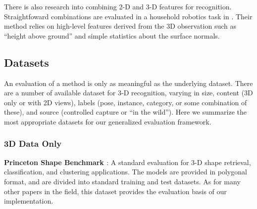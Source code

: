 There is also research into combining 2-D and 3-D features for recognition.
Straightfoward combinations are evaluated in a household robotics task in \cite{Gould2008}.
Their method relies on high-level features derived from the 3D observation such as ``height above ground'' and simple statistics about the surface normals.


\subsection{Datasets}

An evaluation of a method is only as meaningful as the underlying dataset.
There are a number of available dataset for 3-D recognition, varying in size, content (3D only or with 2D views), labels (pose, instance, category, or some combination of these), and source (controlled capture or ``in the wild'').
Here we summarize the most appropriate datasets for our generalized evaluation framework.

\subsubsection{3D Data Only}
{\bf Princeton Shape Benchmark \cite{Shilane2004}}:
A standard evaluation for 3-D shape retrieval, classification, and clustering applications.
The models are provided in polygonal format, and are divided into standard training and test datasets.
As for many other papers in the field, this dataset provides the evaluation basis of our implementation.

